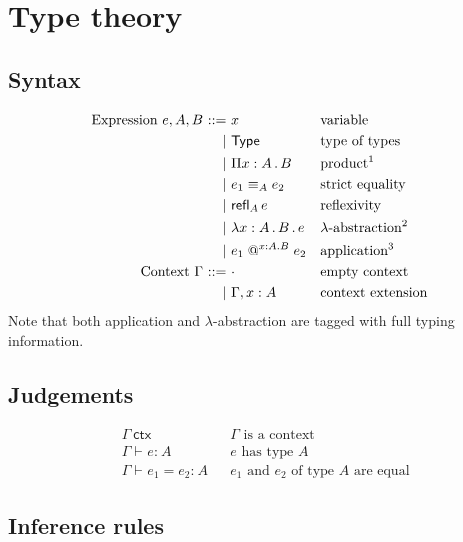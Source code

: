 \documentclass{article}
\makeatletter
\newcommand{\Type}{\mathsf{Type}}
\newcommand{\ctx}{\Gamma}
\newcommand{\emptyctx}{\cdot}
\newcommand{\isctx}[1]{#1\ \mathsf{ctx}}
\newcommand{\of}[1][]{:_{#1}}
\newcommand{\prd}[1]{\Pi #1 \,.\,}
\newcommand{\Eq}[3][]{#2 \equiv_{#1} #3}
\newcommand{\refl}[2][]{\mathsf{refl}_{#1}\,#2}
\newcommand{\fun}[1]{\lambda #1 \,.\,}
\newcommand{\abs}[1]{#1 .}
\newcommand{\app}[3][]{#2 \mathrel{@}^{#1} #3}
\newcommand{\ent}[1][]{\vdash_{#1}}
\newcommand{\bnfis}{\mathbin{{:}{:}{=}}}
\newcommand{\bnfor}{\mathbin{\mid}}
\makeatother
\begin{document}
\section{Type theory}

\subsection{Syntax}

\begin{align*}
  \text{Expression}\ e, A, B \
    \bnfis \ & x                              & & \text{variable}\\
    \bnfor \ & \Type                          & & \text{type of types}\\
    \bnfor \ & \prd{x : A} B                  & & \text{product\footnotemark} \\
    \bnfor \ & \Eq[A]{e_1}{e_2}               & & \text{strict equality} \\
    \bnfor \ & \refl[A]{e}                    & & \text{reflexivity} \\
    \bnfor \ & \fun{x : A \,.\, B} e          & & \text{$\lambda$-abstraction\footnotemark} \\
    \bnfor \ & \app[\abs{x : A} B]{e_1}{e_2}  & & \text{application\footnotemark}
  \\
  \text{Context}\ \ctx\
     \bnfis \ & \emptyctx                     & & \text{empty context} \\
     \bnfor \ & \ctx, x : A                   & & \text{context extension}
\end{align*}
%
%
%
\footnotetext{$x$ is bound in $B$}%
%
Note that both application and $\lambda$-abstraction are tagged with full typing information.


\subsection{Judgements}

\begin{align*}
  & \isctx{\ctx}                & & \text{$\ctx$ is a context}  \\
  & \ctx \ent e \of A         & & \text{$e$ has type $A$}  \\
  & \ctx \ent e_1 = e_2 \of A & & \text{$e_1$ and $e_2$ of type $A$ are equal}
\end{align*}

\subsection{Inference rules}
\end{document}
